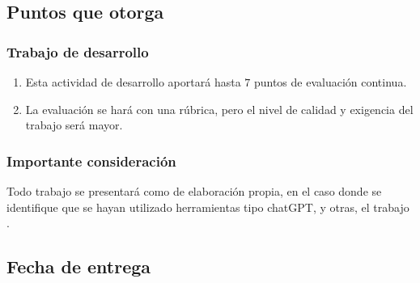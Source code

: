\documentclass[14pt]{beamer}
\begin{document}
\subsection{Puntos que otorga}

\begin{frame}
\frametitle{Trabajo de desarrollo}
\begin{enumerate}[<+->]
\conti
\item Esta actividad de desarrollo aportará hasta $7$ puntos de evaluación continua.
\item La evaluación se hará con una rúbrica, pero el nivel de calidad y exigencia del trabajo será mayor.
\seti
\end{enumerate}
\end{frame}
\begin{frame}
\frametitle{Importante consideración}
Todo trabajo se presentará como de elaboración propia, \pause en el caso donde se identifique que se hayan utilizado herramientas tipo chatGPT, y otras, el trabajo .
\end{frame}

\subsection{Fecha de entrega}
\end{document}
